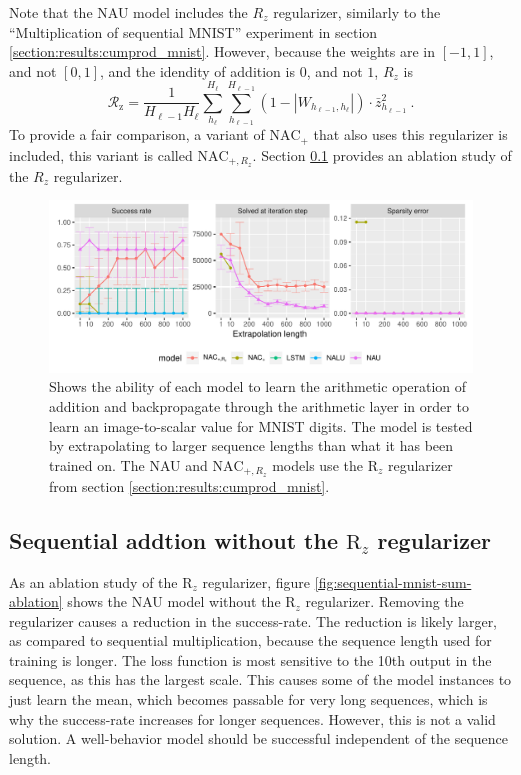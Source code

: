 Note that the NAU model includes the $R_z$ regularizer, similarly to the ``Multiplication of sequential MNIST'' experiment in section \ref{section:results:cumprod_mnist}. However, because the weights are in $[-1, 1]$, and not $[0,1]$, and the idendity of addition is $0$, and not $1$, $R_z$ is 
\begin{equation}
    \mathcal{R}_{\mathrm{z}} = \frac{1}{H_{\ell-1} H_\ell} \sum_{h_\ell}^{H_\ell} \sum_{h_{\ell-1}}^{H_{\ell-1}} (1 - |W_{h_{\ell-1},h_\ell}|) \cdot \bar{z}_{h_{\ell-1}}^2\ .
\end{equation}
To provide a fair comparison, a variant of $\mathrm{NAC}_{+}$ that also uses this regularizer is included, this variant is called $\mathrm{NAC}_{+, R_z}$. Section \ref{sec:appendix:sequential-mnist-sum:ablation} provides an ablation study of the $R_z$ regularizer.

\begin{figure}[h]
\centering
\includegraphics[width=\linewidth,trim={0 0.5cm 0 0},clip]{paper/results/sequential_mnist_sum_long.pdf}
\caption{Shows the ability of each model to learn the arithmetic operation of addition and backpropagate through the arithmetic layer in order to learn an image-to-scalar value for MNIST digits. The model is tested by extrapolating to larger sequence lengths than what it has been trained on. The NAU and $\mathrm{NAC}_{+,R_z}$ models use the $\mathrm{R}_z$ regularizer from section \ref{section:results:cumprod_mnist}.}
\label{fig:sequential-mnist-sum}
\end{figure}

\subsection{Sequential addtion without the \texorpdfstring{$\mathrm{R}_z$}{R\_z} regularizer}
\label{sec:appendix:sequential-mnist-sum:ablation}

As an ablation study of the $\mathrm{R}_z$ regularizer, figure \ref{fig:sequential-mnist-sum-ablation} shows the NAU model without the $\mathrm{R}_z$ regularizer. Removing the regularizer causes a reduction in the success-rate. The reduction is likely larger, as compared to sequential multiplication, because the sequence length used for training is longer. The loss function is most sensitive to the 10th output in the sequence, as this has the largest scale. This causes some of the model instances to just learn the mean, which becomes passable for very long sequences, which is why the success-rate increases for longer sequences. However, this is not a valid solution. A well-behavior model should be successful independent of the sequence length.

